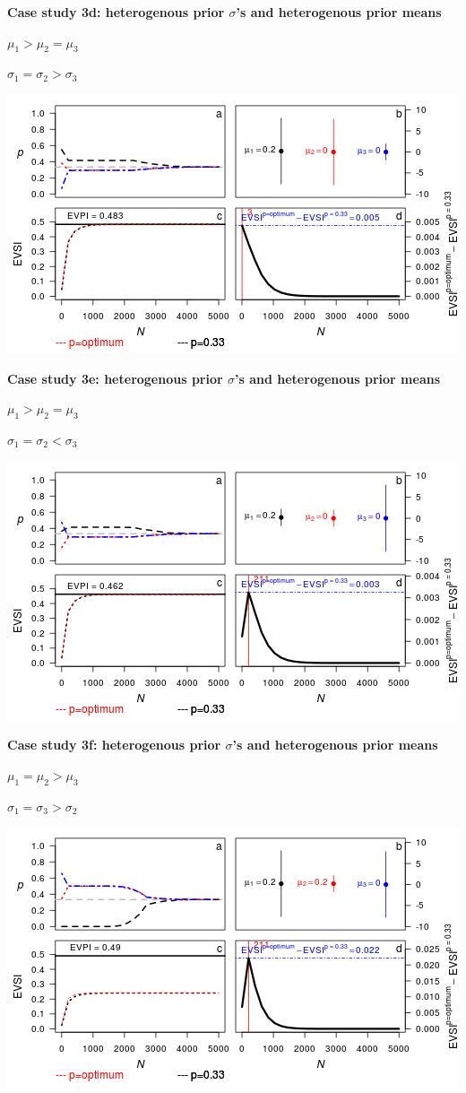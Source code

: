\documentclass[]{article}
\theoremstyle{definition}
\theoremstyle{definition}
\theoremstyle{remark}
\begin{document}
\textbf{Case study 3d: heterogenous prior \(\sigma\)'s and heterogenous
prior means}

\(\mu_1 > \mu_2 = \mu_3\)

\(\sigma_1 = \sigma_2 > \sigma_3\)

\includegraphics{figure/x100__1__1_1c-1.png} \clearpage

\textbf{Case study 3e: heterogenous prior \(\sigma\)'s and heterogenous
prior means}

\(\mu_1 > \mu_2 = \mu_3\)

\(\sigma_1 = \sigma_2 < \sigma_3\)

\includegraphics{figure/x100_1_1__1c-1.png} \clearpage

\textbf{Case study 3f: heterogenous prior \(\sigma\)'s and heterogenous
prior means}

\(\mu_1 = \mu_2 > \mu_3\)

\(\sigma_1 = \sigma_3 > \sigma_2\)

\includegraphics{figure/x110__1_1__1c-1.png} \clearpage
\end{document}
